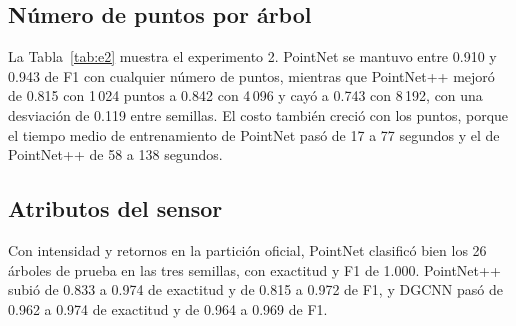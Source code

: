 \documentclass[preprint,12pt]{elsarticle}
\begin{document}
\begin{table}[!htbp]
\centering
\footnotesize
{}
\caption{Experimento 1, partición oficial con 1\,024 puntos. Media y desviación de tres semillas sobre 26 árboles de prueba y 22 de validación.}
\label{tab:e1}
\end{table}


\subsection{Número de puntos por árbol}

La Tabla~\ref{tab:e2} muestra el experimento 2. PointNet se mantuvo entre 0.910 y 0.943 de F1 con cualquier número de puntos, mientras que PointNet++ mejoró de 0.815 con 1\,024 puntos a 0.842 con 4\,096 y cayó a 0.743 con 8\,192, con una desviación de 0.119 entre semillas. El costo también creció con los puntos, porque el tiempo medio de entrenamiento de PointNet pasó de 17 a 77 segundos y el de PointNet++ de 58 a 138 segundos.

\begin{table}[!htbp]
\centering
\footnotesize
{}
\caption{Experimento 2, número de puntos por árbol en la partición oficial. Media y desviación de tres semillas. El tiempo es el promedio por entrenamiento en la GPU T4.}
\label{tab:e2}
\end{table}

\subsection{Atributos del sensor}

Con intensidad y retornos en la partición oficial, PointNet clasificó bien los 26 árboles de prueba en las tres semillas, con exactitud y F1 de 1.000. PointNet++ subió de 0.833 a 0.974 de exactitud y de 0.815 a 0.972 de F1, y DGCNN pasó de 0.962 a 0.974 de exactitud y de 0.964 a 0.969 de F1.
\end{document}
